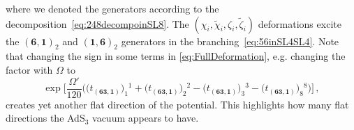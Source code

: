 \documentclass[a4paper, 11pt]{article}
\numberwithin{equation}{section}
\newcommand{\ts}[1]{\widetilde{#1}}
\newcommand{\+}{\oplus}
\begin{document}
where we denoted the generators according to the decomposition~\eqref{eq:248decompoinSL8}. The $(\chi_{i},\ts{\chi}_{i},\zeta_{i},\ts{\zeta}_{i})$ deformations excite the $(\mathbf{6},\mathbf{1})_{2}$ and $(\mathbf{1},\mathbf{6})_{2}$ generators in the branching~\eqref{eq:56inSL4SL4}. Note that changing the sign in some terms in \eqref{eq:FullDeformation}, e.g. changing the factor with $\Omega$ to
\begin{equation}
	\exp\bigg[\frac{\Omega'}{120}\Big(\big(t_{(\mathbf{63},\mathbf{1})}\big)_{1}{}^{1}+\big(t_{(\mathbf{63},\mathbf{1})}\big)_{2}{}^{2}-\big(t_{(\mathbf{63},\mathbf{1})}\big)_{3}{}^{3}-\big(t_{(\mathbf{63},\mathbf{1})}\big)_{8}{}^{8}\Big) \bigg] \,,
\end{equation}
creates yet another flat direction of the potential. This highlights how many flat directions the AdS$_3$ vacuum appears to have.
\end{document}
